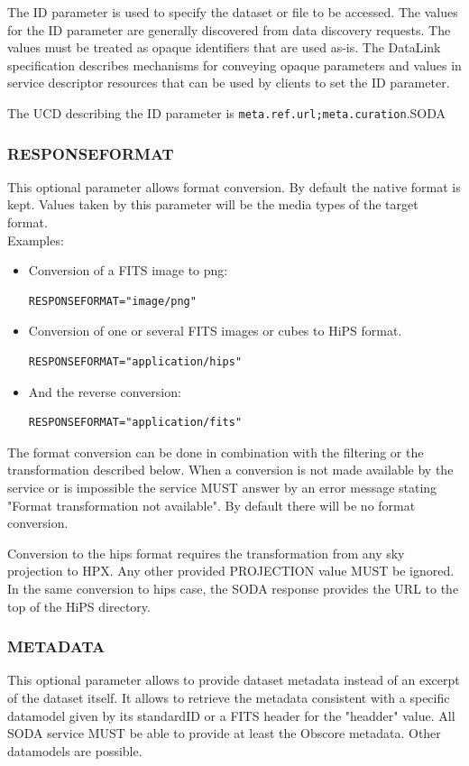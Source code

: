 \documentclass[11pt,a4paper]{ivoa}
\newcommand{\ucd}[1]{\texttt{#1}}
\begin{document}
The ID parameter is used to specify the dataset or file to
be accessed. The values for the ID parameter are generally
discovered from data discovery requests. The
values must be treated as opaque identifiers that are used
as-is. The DataLink specification describes mechanisms
for conveying opaque parameters and values in service
descriptor resources that can be used by clients to set the
ID parameter.

The UCD describing the ID parameter is
\ucd{meta.ref.url;meta.curation}.SODA

\subsubsection{RESPONSEFORMAT}
\label{sec:FORMAT}

This optional parameter allows format conversion. By default the native format is kept. Values taken by this parameter will be the media types of the target format. \\
Examples: 
\begin{itemize}
\item Conversion of a FITS image to png: 
\begin{lstlisting}
RESPONSEFORMAT="image/png"
\end{lstlisting}
\item Conversion of one or several FITS images or cubes to HiPS format. 
\begin{lstlisting}
RESPONSEFORMAT="application/hips"
\end{lstlisting}
\item And the reverse conversion: 
\begin{lstlisting}
RESPONSEFORMAT="application/fits"
\end{lstlisting}
\end{itemize}

The format conversion can be done in combination with the filtering or the transformation described below. When a conversion is not made available by the service or is  impossible the service MUST answer by an error message stating "Format transformation not available". By default there will be no format conversion.

Conversion to the hips format requires the transformation from any sky projection to HPX. Any other provided PROJECTION value MUST be ignored. In the same conversion to hips case, the  SODA response provides the URL to the top of the HiPS directory.

\subsubsection{METADATA}\label{sec:METADATA}
This optional parameter allows to provide dataset metadata instead of an excerpt of the dataset itself. It allows to retrieve the metadata consistent with a specific   datamodel given by its standardID or a FITS header for the "headder" value.  All SODA service MUST be able to provide at least the Obscore metadata. Other datamodels are possible.
\end{document}
